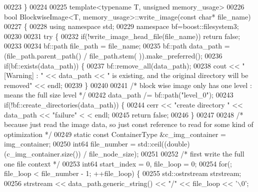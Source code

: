 \begin{DoxyCode}
00223 \}
00224 
00225 \textcolor{keyword}{template}<\textcolor{keyword}{typename} T, \textcolor{keywordtype}{unsigned} memory\_usage>
00226 \textcolor{keywordtype}{bool} BlockwiseImage<T, memory_usage>::write_image(\textcolor{keyword}{const} \textcolor{keywordtype}{char}* file\_name)
00227 \{
00228         \textcolor{keyword}{using namespace }std;
00229         \textcolor{keyword}{namespace }bf=boost::filesystem3;
00230 
00231         \textcolor{keywordflow}{try} \{
00232                 \textcolor{keywordflow}{if}(!write\_image\_head\_file(file\_name))   \textcolor{keywordflow}{return} \textcolor{keyword}{false};
00233 
00234                 bf::path file\_path = file\_name;
00235                 bf::path data\_path = (file\_path.parent\_path() / file\_path.stem(
      )).make\_preferred();
00236                 \textcolor{keywordflow}{if}(bf::exists(data\_path)) \{
00237                         bf::remove\_all(data\_path);
00238                         cout << \textcolor{stringliteral}{"[Warning] : "} << data\_path << \textcolor{stringliteral}{" is existing,
       and the original directory will be removed"} << endl;
00239                 \}
00240 
00241                 \textcolor{comment}{/* block wise image only has one level : means the full size
       level */}
00242                 data\_path /= bf::path(\textcolor{stringliteral}{"level\_0"});
00243                 \textcolor{keywordflow}{if}(!bf::create\_directories(data\_path)) \{
00244                         cerr << \textcolor{stringliteral}{"create directory "} << data\_path << \textcolor{stringliteral}{"failure"} <
      < endl;
00245                         \textcolor{keywordflow}{return} \textcolor{keyword}{false};
00246                 \}
00247 
00248                 \textcolor{comment}{/* because just read the image data, so just const reference to
       read for some kind of optimization */}
00249                 \textcolor{keyword}{static} \textcolor{keyword}{const} ContainerType &c\_img\_container = img\_container;
00250                 int64 file\_number = std::ceil((\textcolor{keywordtype}{double})(c\_img\_container.size()) 
      / file\_node\_size);
00251 
00252                 \textcolor{comment}{/* first write the full one file context */}
00253                 int64 start\_index = 0, file\_loop = 0;
00254                 \textcolor{keywordflow}{for}(; file\_loop < file\_number - 1; ++file\_loop) \{
00255                         std::ostrstream strstream;
00256                         strstream << data\_path.generic\_string() << \textcolor{stringliteral}{"/"} << 
      file\_loop << \textcolor{charliteral}{'\(\backslash\)0'};

\end{DoxyCode}
